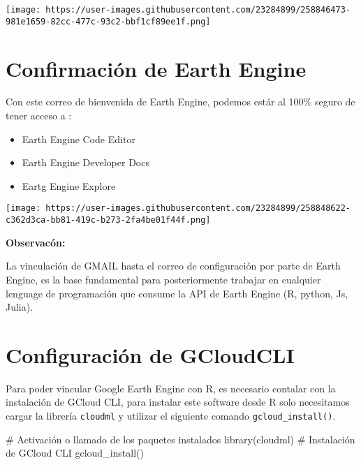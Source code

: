\documentclass[
  letterpaper,
  DIV=11,
  numbers=noendperiod]{scrreprt}
\newenvironment{Shaded}{\begin{snugshade}}{\end{snugshade}}
\newcommand{\CommentTok}[1]{\textcolor[rgb]{0.37,0.37,0.37}{#1}}
\newcommand{\FunctionTok}[1]{\textcolor[rgb]{0.28,0.35,0.67}{#1}}
\newcommand{\NormalTok}[1]{\textcolor[rgb]{0.00,0.23,0.31}{#1}}
\providecommand{\tightlist}{%
  \setlength{\itemsep}{0pt}\setlength{\parskip}{0pt}}\usepackage{longtable,booktabs,array}
\begin{document}
\texttt{[image: https://user-images.githubusercontent.com/23284899/258846473-981e1659-82cc-477c-93c2-bbf1cf89ee1f.png]}

\hypertarget{confirmaciuxf3n-de-earth-engine}{%
\section{Confirmación de Earth
Engine}\label{confirmaciuxf3n-de-earth-engine}}

Con este correo de bienvenida de Earth Engine, podemos estár al 100\%
seguro de tener acceso a :

\begin{itemize}
\tightlist
\item
  Earth Engine Code Editor
\item
  Earth Engine Developer Docs
\item
  Eartg Engine Explore
\end{itemize}

\texttt{[image: https://user-images.githubusercontent.com/23284899/258848622-c362d3ca-bb81-419c-b273-2fa4be01f44f.png]}

\begin{tcolorbox}[enhanced jigsaw, opacityback=0, toprule=.15mm, colback=white, breakable, arc=.35mm, colframe=quarto-callout-caution-color-frame, leftrule=.75mm, rightrule=.15mm, left=2mm, bottomrule=.15mm]

\textbf{Observacón:}\vspace{2mm}

La vinculación de GMAIL hasta el correo de configuración por parte de
Earth Engine, es la base fundamental para posteriormente trabajar en
cualquier lenguage de programación que consume la API de Earth Engine
(R, python, Js, Julia).

\end{tcolorbox}

\hypertarget{configuraciuxf3n-de-gcloudcli}{%
\section{Configuración de
GCloudCLI}\label{configuraciuxf3n-de-gcloudcli}}

Para poder vincular Google Earth Engine con R, es necesario contalar con
la instalación de GCloud CLI, para instalar este software desde R solo
necesitamos cargar la librería \texttt{cloudml} y utilizar el siguiente
comando \texttt{gcloud\_install()}.

\begin{Shaded}
\begin{Highlighting}[]
\CommentTok{\# Activación o llamado de los paquetes instalados}
\FunctionTok{library}\NormalTok{(cloudml)}
\CommentTok{\# Instalación de GCloud CLI}
\FunctionTok{gcloud\_install}\NormalTok{()}
\end{Highlighting}
\end{Shaded}
\end{document}
